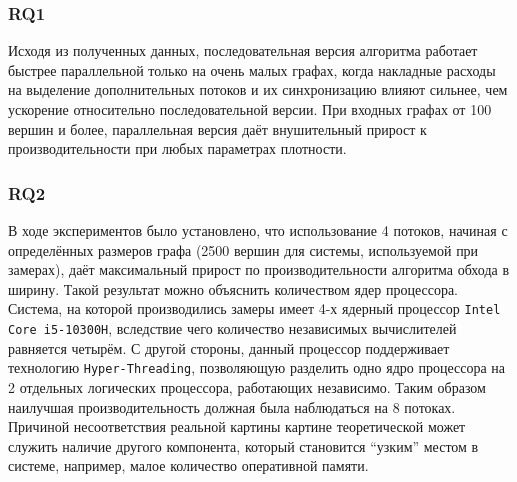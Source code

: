 \subsubsection{RQ1} Исходя из полученных данных, последовательная версия алгоритма работает быстрее параллельной только на очень малых графах, когда накладные расходы на выделение дополнительных потоков и их синхронизацию влияют сильнее, чем ускорение относительно последовательной версии. При входных графах от 100 вершин и более, параллельная версия даёт внушительный прирост к производительности при любых параметрах плотности.
\subsubsection{RQ2} В ходе экспериментов было установлено, что использование 4 потоков, начиная с определённых размеров графа (2500 вершин для системы, используемой при замерах), даёт максимальный прирост по производительности алгоритма обхода в ширину. Такой результат можно объяснить количеством ядер процессора. Система, на которой производились замеры имеет 4-х ядерный процессор \texttt{Intel Core i5-10300H}, вследствие чего количество независимых вычислителей равняется четырём. С другой стороны, данный процессор поддерживает технологию \texttt{Hyper-Threading}, позволяющую разделить одно ядро процессора на 2 отдельных логических процессора, работающих независимо. Таким образом наилучшая производительность должная была наблюдаться на 8 потоках. Причиной несоответствия реальной картины картине теоретической может служить наличие другого компонента, который становится \enquote{узким} местом в системе, например, малое количество оперативной памяти.
